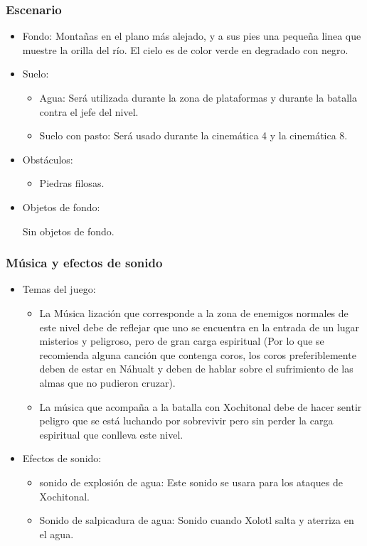 \documentclass[11pt,letterpaper]{article}
\begin{document}
\subsubsection{Escenario}
\begin{itemize} 
	\item Fondo:
Montañas en el plano más alejado, y a sus pies una pequeña linea que muestre la orilla del río. El cielo es de color verde en degradado con negro.
	\item Suelo:
		\begin{itemize}
			\item Agua: Será utilizada durante la zona de plataformas y durante la batalla contra el jefe del nivel.
			\item Suelo con pasto: Será usado durante la cinemática 4 y la cinemática 8.
		\end{itemize}
	\item Obstáculos:
		\begin{itemize}
			\item Piedras filosas.				
		\end{itemize}
	\item Objetos de fondo: 
	\\
	\par	
	Sin objetos de fondo.
	
\end{itemize}	
	
	\subsubsection{Música y efectos de sonido}
\begin{itemize}
	\item Temas del juego:
		\begin{itemize}
			\item La Música lización que corresponde a la zona de enemigos normales de este nivel debe de reflejar que uno se encuentra en la entrada de un lugar misterios y peligroso, pero de gran carga espiritual (Por lo que se recomienda alguna canción que contenga coros, los coros preferiblemente deben de estar en Náhualt y deben de hablar sobre el sufrimiento de las almas que no pudieron cruzar).
			\item La música que acompaña a la batalla con Xochitonal debe de hacer sentir peligro que se está luchando por sobrevivir pero sin perder la carga espiritual que conlleva este nivel.
		\end{itemize}
	\item Efectos de sonido:
		\begin{itemize}
			\item sonido de explosión de agua: Este sonido se usara para los ataques de Xochitonal.
			\item Sonido de salpicadura de agua: Sonido cuando Xolotl salta y aterriza en el agua. 
		\end{itemize}
\end{itemize}
\end{document}

